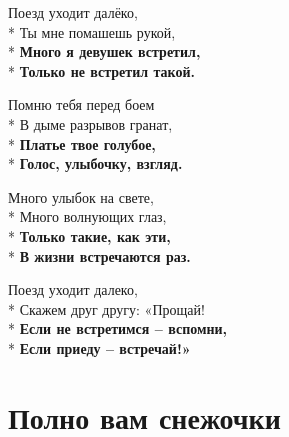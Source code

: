 \medskip

\begin{minipage}{\linewidth}
Поезд уходит далёко,\\*
Ты мне помашешь рукой,\\*
\textbf{Много я девушек встретил,}\\*
\textbf{Только не встретил такой.}\\
\end{minipage}\par\medskip\nobreak

\medskip

\begin{minipage}{\linewidth}
Помню тебя перед боем\\*
В дыме разрывов гранат,\\*
\textbf{Платье твое голубое,}\\*
\textbf{Голос, улыбочку, взгляд.}\\
\end{minipage}\par\medskip\nobreak

\medskip

\begin{minipage}{\linewidth}
Много улыбок на свете,\\*
Много волнующих глаз,\\*
\textbf{Только такие, как эти,}\\*
\textbf{В жизни встречаются раз.}\\
\end{minipage}\par\medskip\nobreak

\medskip

\begin{minipage}{\linewidth}
Поезд уходит далеко,\\*
Скажем друг другу: «Прощай!\\*
\textbf{Если не встретимся – вспомни,}\\*
\textbf{Если приеду – встречай!»}\\
\end{minipage}

\vspace{\fill}\newpage

\section{Полно вам снежочки}
\label{song:Полно_вам_снежочки}

\medskip


